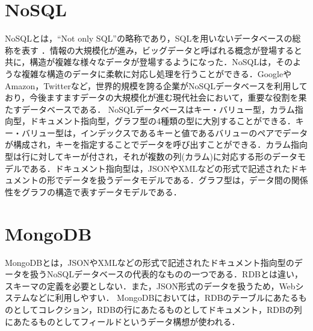 \documentclass[a4paper,11pt]{ujreport}
\begin{document}
\section{NoSQL}
NoSQLとは，“Not only SQL”の略称であり，SQLを用いないデータベースの総称を表す \cite{太田201204}．情報の大規模化が進み，ビッグデータと呼ばれる概念が登場すると共に，構造が複雑な様々なデータが登場するようになった．NoSQLは，そのような複雑な構造のデータに柔軟に対応し処理を行うことができる．GoogleやAmazon，Twitterなど，世界的規模を誇る企業がNoSQLデータベースを利用しており，今後ますますデータの大規模化が進む現代社会において，重要な役割を果たすデータベースである\cite{太田201204}．
NoSQLデータベースはキー・バリュー型，カラム指向型，ドキュメント指向型，グラフ型の4種類の型に大別することができる．キー・バリュー型は，インデックスであるキーと値であるバリューのペアでデータが構成され，キーを指定することでデータを呼び出すことができる．カラム指向型は行に対してキーが付され，それが複数の列(カラム)に対応する形のデータモデルである．ドキュメント指向型は，JSONやXMLなどの形式で記述されたドキュメントの形でデータを扱うデータモデルである．グラフ型は，データ間の関係性をグラフの構造で表すデータモデルである\cite{太田201204}．

\section{MongoDB}
MongoDBとは，JSONやXMLなどの形式で記述されたドキュメント指向型のデータを扱うNoSQLデータベースの代表的なものの一つである．RDBとは違い，スキーマの定義を必要としない\cite{太田201204}\cite{mongodb}．また，JSON形式のデータを扱うため，Webシステムなどに利用しやすい．
MongoDBにおいては，RDBのテーブルにあたるものとしてコレクション，RDBの行にあたるものとしてドキュメント，RDBの列にあたるものとしてフィールドというデータ構想が使われる．
\end{document}
